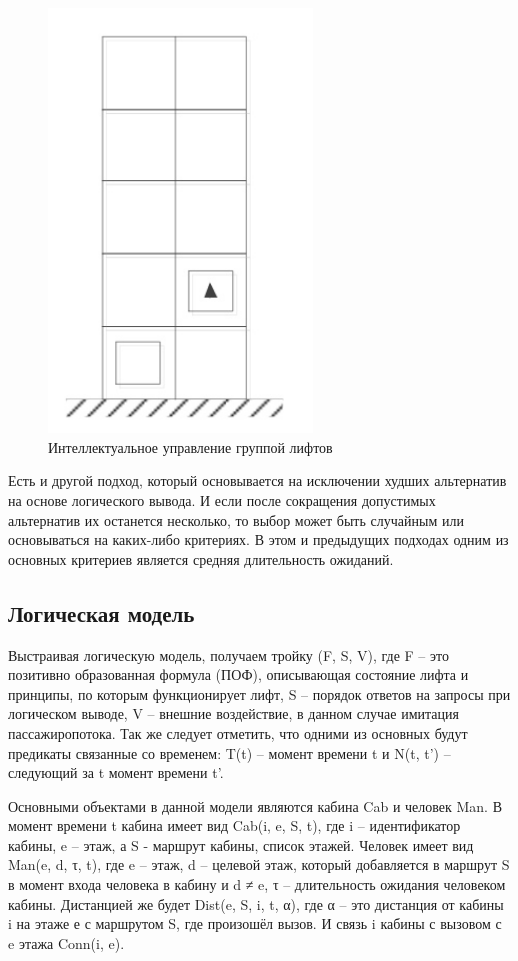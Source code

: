          \begin{figure}[h]
				\centering
				\includegraphics[width=70mm]{src/pictures/uproshenie.jpg}
				\caption{Интеллектуальное управление группой лифтов}\label{dk7}
    \end{figure}

	Есть и другой подход, который основывается на исключении худших альтернатив на основе логического вывода.
		И если после сокращения допустимых альтернатив их останется несколько,
		то выбор может быть случайным или основываться на каких-либо критериях.
		В этом и предыдущих подходах одним из основных критериев является средняя длительность ожиданий.

\subsection{Логическая модель}
	Выстраивая логическую модель, получаем тройку (F, S, V), где F -- это позитивно образованная формула (ПОФ),
		описывающая состояние лифта и принципы, по которым функционирует лифт,
		S -- порядок ответов на запросы при логическом выводе, V -- внешние воздействие,
		в данном случае имитация пассажиропотока. Так же следует отметить, что одними из основных будут
		предикаты связанные со временем: T(t) -- момент времени t и N(t, t') -- следующий за t момент времени t'.

	Основными объектами в данной модели являются кабина Cab и человек Man.
		В момент времени t кабина имеет вид Cab(i, e, S, t), где i – идентификатор кабины, e – этаж,
		а S - маршрут кабины, список этажей. Человек имеет вид Man(e, d, τ, t), где e – этаж,
		d – целевой этаж, который добавляется в маршрут S в момент входа человека в кабину и d ≠ e,
		τ – длительность ожидания человеком кабины.
		Дистанцией же будет Dist(e, S, i, t, α), где α – это дистанция от кабины i
		на этаже е с маршрутом S, где произошёл вызов. И связь i кабины с вызовом с e этажа Conn(i, e).

